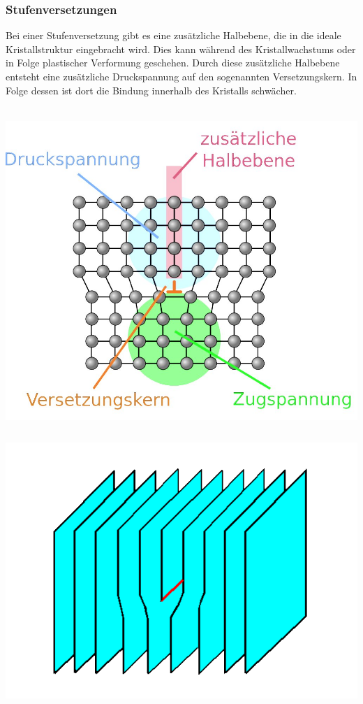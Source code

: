 \documentclass[german,  %
parskip=full,  %
]{scrartcl}
\begin{document}
\subsubsection{Stufenversetzungen}
Bei einer Stufenversetzung gibt es eine zusätzliche Halbebene, die in die ideale Kristallstruktur eingebracht wird. Dies kann während des Kristallwachstums oder in Folge plastischer Verformung geschehen. Durch diese zusätzliche Halbebene entsteht eine zusätzliche Druckspannung auf den sogenannten Versetzungskern. In Folge dessen ist dort die Bindung innerhalb des Kristalls schwächer. \\\\
\begin{minipage}{0.35 \textwidth} \centering
\includegraphics[scale=0.2]{Stufenversetzung1.jpg}
\end{minipage}
\begin{minipage}{0.2\textwidth}\centering
\[\]
\end{minipage}
\begin{minipage}{0.45 \textwidth} \centering
\[\]
\includegraphics[scale=0.3]{Stufenversetzung2.png}
\end{minipage}
\end{document}
